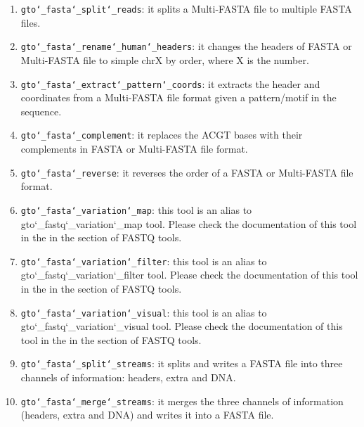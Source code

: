 \begin{enumerate}
\item \texttt{gto\char`_fasta\char`_split\char`_reads}: it splits a Multi-FASTA file to multiple FASTA files.

\item \texttt{gto\char`_fasta\char`_rename\char`_human\char`_headers}: it changes the headers of FASTA or Multi-FASTA file to simple chrX by order, where X is the number.

\item \texttt{gto\char`_fasta\char`_extract\char`_pattern\char`_coords}: it extracts the header and coordinates from a Multi-FASTA file format given a pattern/motif in the sequence.

\item \texttt{gto\char`_fasta\char`_complement}: it replaces the ACGT bases with their complements in FASTA or Multi-FASTA file format.

\item \texttt{gto\char`_fasta\char`_reverse}: it reverses the order of a FASTA or Multi-FASTA file format.

\item \texttt{gto\char`_fasta\char`_variation\char`_map}: this tool is an alias to gto\char`_fastq\char`_variation\char`_map tool. Please check the documentation of this tool in the in the section of FASTQ tools. 

\item \texttt{gto\char`_fasta\char`_variation\char`_filter}: this tool is an alias to gto\char`_fastq\char`_variation\char`_filter tool. Please check the documentation of this tool in the in the section of FASTQ tools. 

\item \texttt{gto\char`_fasta\char`_variation\char`_visual}: this tool is an alias to gto\char`_fastq\char`_variation\char`_visual tool. Please check the documentation of this tool in the in the section of FASTQ tools. 

\item \texttt{gto\char`_fasta\char`_split\char`_streams}: it splits and writes a FASTA file into three channels of information: headers, extra and DNA. 

\item \texttt{gto\char`_fasta\char`_merge\char`_streams}: it merges the three channels of information (headers, extra and DNA) and writes it into a FASTA file.


\end{enumerate}





 










